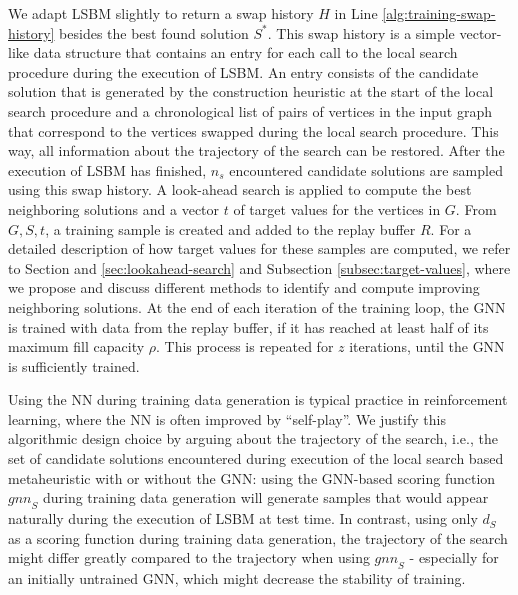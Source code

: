 \documentclass[draft,final]{vutinfth} %
\begin{document}
We adapt LSBM slightly to return a swap history $H$ in Line \ref{alg:training-swap-history} besides the best found solution $S^*$. This swap history is a simple vector-like data structure that contains an entry for each call to the local search procedure during the execution of LSBM. An entry consists of the candidate solution that is generated by the construction heuristic at the start of the local search procedure and a chronological list of pairs of vertices in the input graph that correspond to the vertices swapped during the local search procedure. This way, all information about the trajectory of the search can be restored. 
After the execution of LSBM has finished, $n_s$ encountered candidate solutions are sampled using this swap history. 
A look-ahead search is applied to compute the best neighboring solutions and a vector $t$ of target values for the vertices in $G$. From $G, S, t$, a training sample is created and added to the replay buffer $R$. For a detailed description of how target values for these samples are computed, we refer to Section and \ref{sec:lookahead-search} and Subsection \ref{subsec:target-values}, where we propose and discuss different methods to identify and compute improving neighboring solutions. 
At the end of each iteration of the training loop, the GNN is trained with data from the replay buffer, if it has reached at least half of its maximum fill capacity $\rho$. 
This process is repeated for $z$ iterations, until the GNN is sufficiently trained. 

Using the NN during training data generation is typical practice in reinforcement learning, where the NN is often improved by ``self-play''. 
We justify this algorithmic design choice by arguing about the trajectory of the search, i.e., the set of candidate solutions encountered during execution of the local search based metaheuristic with or without the GNN: using the GNN-based scoring function $\mathit{gnn}_S$ during training data generation will generate samples that would appear naturally during the execution of LSBM at test time. In contrast, using only $d_S$ as a scoring function during training data generation, the trajectory of the search might differ greatly compared to the trajectory when using $\mathit{gnn}_S$ - especially for an initially untrained GNN, which might decrease the stability of training. 
\end{document}
